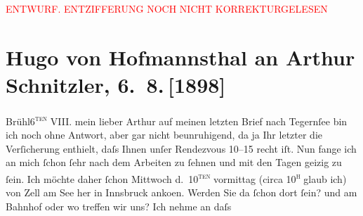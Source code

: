 
\begin{center}
            \textcolor{red}{ENTWURF. ENTZIFFERUNG NOCH NICHT KORREKTURGELESEN}
                      \end{center}
            
               \section[Hugo von Hofmannsthal an Arthur Schnitzler, 6. 8. {[}1898{]}]{ Hugo von Hofmannsthal an Arthur Schnitzler, 6. 8. {[}1898{]}}\nopagebreak{}\rehead{ }\begin{ledgroupsized}[t]{13cm}\normalsize\beginnumbering{} \toendnotes[C]{\smallbreak\pagebreak[2]} 
\toendnotes[C]{\smallbreak}\pstart
           \raggedleft{}{\pb}Brühl6\textsc{\textsuperscript{ten}} VIII.\pend
           \pstart{}mein lieber Arthur\pend\pstart
           auf meinen letzten Brief \introOben{}nach Tegernſee\introOben{} bin ich noch ohne Antwort, aber gar nicht beunruhigend, da ja Ihr letzter
                    die Verſicherung enthielt, daſs Ihnen unſer Rendezvous
                        10–15 recht iſt. Nun fange ich an mich ſchon ſehr
                    nach dem Arbeiten zu ſehnen und mit den Tagen geizig zu ſein.\pend
           \pstart
           {\pb}Ich möchte daher ſchon
                        Mittwoch d. 10\textsc{\textsuperscript{ten}} vormittag (circa 10\textsc{\textsuperscript{h}} glaub ich) von Zell am See her in Innsbruck anko{\geminationm}en.
                    Werden Sie da ſchon dort ſein? und am Bahnhof oder wo treffen wir uns? Ich nehme an daſs

\end{ledgroupsized}
